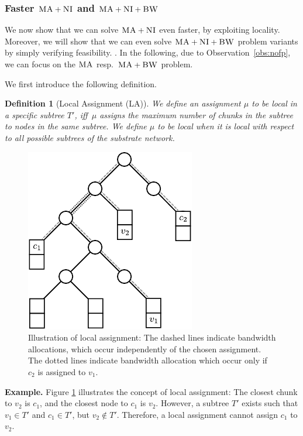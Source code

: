 \documentclass[9pt]{sigcomm-alternate}
\newcommand{\VmChunkAssignment}{\mu}
\newcommand{\CC}{\textsc{NI}}
\newcommand{\BW}{\textsc{BW}}
\newcommand{\MA}{\textsc{MA}}
\newtheorem{defn}{Definition}
\newcommand{\Tree}{\ensuremath{T}}
\begin{document}
\subsubsection{Faster $\MA+\CC$ and $\MA+\CC+\BW$}

We now show that we can solve $\MA+\CC$ even faster, by exploiting
locality. Moreover, we will show that we can
even solve
$\MA+\CC+\BW$ problem variants by simply
verifying feasibility.
.
In the following, due to Observation~\ref{obs:nofp}, we can focus on
the $\MA$ resp.~$\MA+\BW$ problem.

We first introduce the following definition.
\begin{defn}[Local Assignment (LA)]\label{def:loc}
We define an assignment $\VmChunkAssignment$ to
be \emph{local in a specific subtree $\Tree'$}, iff~$\VmChunkAssignment$
assigns the maximum number of chunks in the
subtree to nodes in the same subtree.
We define $\VmChunkAssignment$ to be \emph{local} when
it is local with respect to all possible subtrees of the substrate network.
\end{defn}

\begin{figure}
\center
\includegraphics[width = 0.6\columnwidth]{figs/unbalanced_tree}
\caption{Illustration of local assignment: The dashed lines indicate bandwidth allocations, which occur
independently of the chosen assignment. The dotted lines indicate bandwidth
allocation which occur only if $c_2$ is assigned to $v_1$.}
\label{fig:unbalanced_tree}
\end{figure}

\textbf{Example.}
Figure \ref{fig:unbalanced_tree} illustrates the concept of local assignment:
The closest chunk to $v_2$ is $c_1$, and the closest node to $c_1$ is $v_2$.
However, a subtree $T'$ exists such that $v_1 \in T'$ and $c_1
\in T'$, but $v_2 \notin T'$. Therefore, a local assignment cannot assign $c_1$ to $v_2$.
\end{document}
